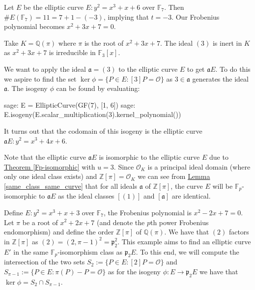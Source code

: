 \documentclass[openany, a4paper, 10pt]{book}
\theoremstyle{plain}
\theoremstyle{plain}
\theoremstyle{plain}
\theoremstyle{definition}
\theoremstyle{plain}
\theoremstyle{definition}
\theoremstyle{remark}
\newcommand{\theoref}[1]{\hyperref[#1]{Theorem \ref{#1}}}
\newcommand{\lemref}[1]{\hyperref[#1]{Lemma \ref{#1}}}
\begin{document}
\begin{examplebox}
    Let $E$ be the elliptic curve $E: y^2 = x^3 + x + 6$ over $\mathbb F_7$.
    Then $\#E(\mathbb F_7) = 11 = 7+1-(-3)$, implying that $t=-3$.
    Our Frobenius polynomial becomes $x^2 + 3x + 7 = 0$.

    Take $K = \mathbb Q(\pi)$ where $\pi$ is the root of $x^2 + 3x + 7$.
    The ideal $(3)$ is inert in $K$ as $x^2+3x+7$ is irreducible in $\mathbb F_3[x]$.

    We want to apply the ideal $\mathfrak a = (3)$ to the elliptic curve $E$ to get $\mathfrak aE$.
    To do this we aspire to find the set $\ker \phi = \{ P \in E: [3]P = \mathcal O \}$ as $3\in\mathfrak a$ generates the ideal $\mathfrak a$.
    The isogeny $\phi$ can be found by evaluating:
    \begin{python}
sage: E = EllipticCurve(GF(7), [1, 6])
sage: E.isogeny(E.scalar_multiplication(3).kernel_polynomial())
    \end{python}
    It turns out that the codomain of this isogeny is the elliptic curve $\mathfrak aE: y^2 = x^3 + 4x + 6$.

    Note that the elliptic curve $\mathfrak aE$ is isomorphic to the elliptic curve $E$ due to \theoref{Fp-isomorphic} with $u=3$.
    Since $\mathcal O_K$ is a principal ideal domain (where only one ideal class exists) and $\mathbb Z[\pi] = \mathcal O_K$ we can see from \lemref{same_class_same_curve} that for all ideals $\mathfrak a$ of $\mathbb Z[\pi]$, the curve $E$ will be $\mathbb F_p$-isomorphic to $\mathfrak aE$ as the ideal classes $[(1)]$ and $[\mathfrak a]$ are identical.

    \tcbline

    Define $E: y^2 = x^3 + x + 3$ over $\mathbb F_7$, the Frobenius polynomial is $x^2 - 2x + 7 = 0$.
    Let $\pi$ be a root of $x^2+2x+7$ (and denote the $p$th power Frobenius endomorphism) and define the order $\mathbb Z[\pi]$ of $\mathbb Q(\pi)$.
    We have that $(2)$ factors in $\mathbb Z[\pi]$ as $(2) = (2, \pi-1)^2 = \mathfrak p_2^2$.
    This example aims to find an elliptic curve $E'$ in the same $\mathbb F_p$-isomorphism class as $\mathfrak p_2 E$.
    To this end, we will compute the intersection of the two sets $S_2 := \{ P \in E: [2]P = \mathcal O \}$ and $S_{\pi-1} := \{ P \in E: \pi(P)-P = \mathcal O \}$ as for the isogeny $\phi: E \to \mathfrak p_2E$ we have that $\ker\phi = S_2 \cap S_{\pi-1}$.


\end{examplebox}
\end{document}
